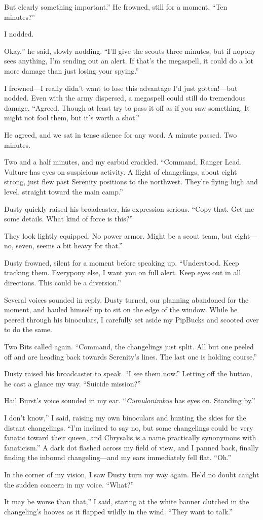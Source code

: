 \leavevmode{}But clearly something important.” He frowned, still for a moment. “Ten minutes?”

I nodded.

\leavevmode{}Okay,” he said, slowly nodding. “I’ll give the scouts three minutes, but if nopony sees anything, I’m sending out an alert. If that’s the megaspell, it could do a lot more damage than just losing your spying.”

I frowned—I really didn’t want to lose this advantage I’d just gotten!—but nodded. Even with the army dispersed, a megaspell could still do tremendous damage. “Agreed. Though at least try to pass it off as if you saw something. It might not fool them, but it’s worth a shot.”

He agreed, and we sat in tense silence for any word. A minute passed. Two minutes.

Two and a half minutes, and my earbud crackled. “Command, Ranger Lead. Vulture has eyes on suspicious activity. A flight of changelings, about eight strong, just flew past Serenity positions to the northwest. They’re flying high and level, straight toward the main camp.”

Dusty quickly raised his broadcaster, his expression serious. “Copy that. Get me some details. What kind of force is this?”

\leavevmode{}They look lightly equipped. No power armor. Might be a scout team, but eight—no, seven, seems a bit heavy for that.”

Dusty frowned, silent for a moment before speaking up. “Understood. Keep tracking them. Everypony else, I want you on full alert. Keep eyes out in all directions. This could be a diversion.”

Several voices sounded in reply. Dusty turned, our planning abandoned for the moment, and hauled himself up to sit on the edge of the window. While he peered through his binoculars, I carefully set aside my PipBucks and scooted over to do the same.

Two Bits called again. “Command, the changelings just split. All but one peeled off and are heading back towards Serenity’s lines. The last one is holding course.”

Dusty raised his broadcaster to speak. “I see them now.” Letting off the button, he cast a glance my way. “Suicide mission?”

Hail Burst’s voice sounded in my ear. “\textit{Cumulonimbus} has eyes on. Standing by.”

\leavevmode{}I don’t know,” I said, raising my own binoculars and hunting the skies for the distant changelings. “I’m inclined to say no, but some changelings could be very fanatic toward their queen, and Chrysalis is a name practically synonymous with fanaticism.” A dark dot flashed across my field of view, and I panned back, finally finding the inbound changeling—and my ears immediately fell flat. “Oh.”

In the corner of my vision, I saw Dusty turn my way again. He’d no doubt caught the sudden concern in my voice. “What?”

\leavevmode{}It may be worse than that,” I said, staring at the white banner clutched in the changeling’s hooves as it flapped wildly in the wind. “They want to talk.”